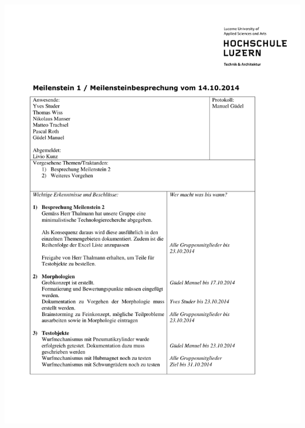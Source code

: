   	 
  	 \includegraphics[page=1,width=\textwidth]{Anhangsdokument/Besprechung_MS1.pdf}
  	 \newpage
